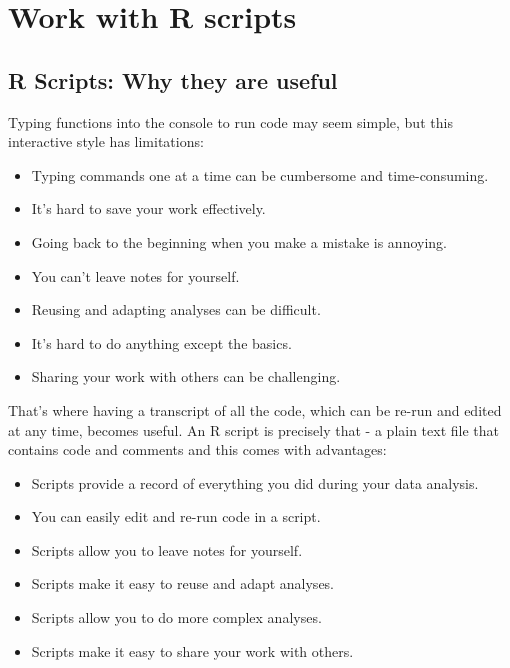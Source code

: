 \documentclass[
  12pt,
  oneside]{book}
\providecommand{\tightlist}{%
  \setlength{\itemsep}{0pt}\setlength{\parskip}{0pt}}
\begin{document}
\hypertarget{work-with-r-scripts}{%
\chapter{Work with R scripts}\label{work-with-r-scripts}}

\hypertarget{r-scripts-why-they-are-useful}{%
\section{R Scripts: Why they are useful}\label{r-scripts-why-they-are-useful}}

Typing functions into the console to run code may seem simple, but this interactive style has limitations:

\begin{itemize}
\tightlist
\item
  Typing commands one at a time can be cumbersome and time-consuming.
\item
  It's hard to save your work effectively.
\item
  Going back to the beginning when you make a mistake is annoying.
\item
  You can't leave notes for yourself.
\item
  Reusing and adapting analyses can be difficult.
\item
  It's hard to do anything except the basics.
\item
  Sharing your work with others can be challenging.
\end{itemize}

That's where having a transcript of all the code, which can be re-run and edited at any time, becomes useful. An R script is precisely that - a plain text file that contains code and comments and this comes with advantages:

\begin{itemize}
\tightlist
\item
  Scripts provide a record of everything you did during your data analysis.
\item
  You can easily edit and re-run code in a script.
\item
  Scripts allow you to leave notes for yourself.
\item
  Scripts make it easy to reuse and adapt analyses.
\item
  Scripts allow you to do more complex analyses.
\item
  Scripts make it easy to share your work with others.
\end{itemize}
\end{document}
